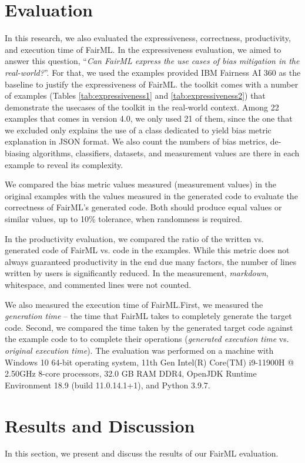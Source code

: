 \documentclass[sigconf,review]{acmart}
\begin{document}
\section{Evaluation}
\label{sec:evaluation}
In this research, we also evaluated the expressiveness, correctness, productivity, and execution time of FairML. In the expressiveness evaluation, we aimed to answer this question, 
``\textit{Can FairML express the use cases of bias mitigation in the real-world?}''. For that, we used the examples provided IBM Fairness AI 360 as the baseline to justify the expressiveness of FairML. 
the toolkit comes with a number of examples (Tables \ref{tab:expressiveness1} and \ref{tab:expressiveness2}) that demonstrate 
the usecases of the toolkit in the real-world context. 
Among 22 examples that comes in version 4.0, we only used 21 of them, 
since the one that we excluded only explains the use of a class dedicated to yield bias metric explanation in JSON format. We also count the numbers of bias metrics, de-biasing algorithms, classifiers, datasets, and measurement values are there in each example to reveal its complexity. 

We compared the bias metric values measured (measurement values) in the original examples with the values measured in the generated code to evaluate the correctness of FairML's generated code. Both should produce equal values or similar values, up to 10\% tolerance, when randomness is required.  

In the productivity evaluation, 
we compared the ratio of the written vs. generated code of FairML vs.
code in the examples. 
While this metric does not always guaranteed productivity in the end due many factors, 
the number of lines written by users is significantly reduced. In the measurement, \textit{markdown}, whitespace, and commented lines were not counted.

We also measured the execution time of FairML.First, we measured the \textit{generation time} -- the time that FairML takes to completely generate the target code. Second, we compared the time taken by the generated target code against the example code to to complete their operations (\textit{generated execution time} vs. \textit{original execution time}). The evaluation was performed on a machine with Windows 10 64-bit operating system, 11th Gen Intel(R) Core(TM) i9-11900H @ 2.50GHz 8-core processors, 32.0 GB RAM DDR4, OpenJDK Runtime Environment 18.9 (build 11.0.14.1+1), and Python 3.9.7.

\section{Results and Discussion}
\label{sec:result_and_discussion}
In this section, we present and discuss the results of our FairML evaluation.
\end{document}
